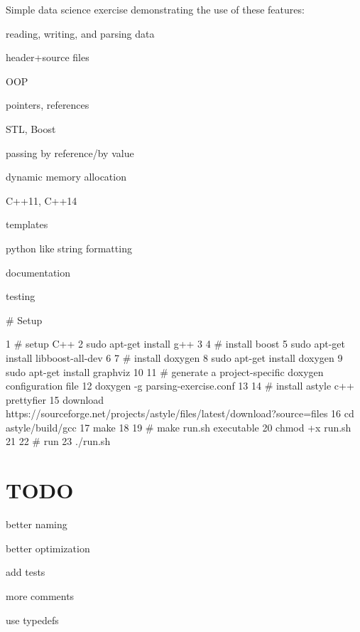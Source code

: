 Simple data science exercise demonstrating the use of these features\+:


\begin{DoxyItemize}
\item reading, writing, and parsing data
\item header+source files
\item O\+OP
\item pointers, references
\item S\+TL, Boost
\item passing by reference/by value
\item dynamic memory allocation
\item C++11, C++14
\item templates
\item python like string formatting
\item documentation
\item testing
\end{DoxyItemize}

\# Setup 
\begin{DoxyCode}
1 # setup C++
2 sudo apt-get install g++
3 
4 # install boost
5 sudo apt-get install libboost-all-dev
6 
7 # install doxygen
8 sudo apt-get install doxygen
9 sudo apt-get install graphviz
10 
11 # generate a project-specific doxygen configuration file
12 doxygen -g parsing-exercise.conf
13 
14 # install astyle c++ prettyfier
15 download https://sourceforge.net/projects/astyle/files/latest/download?source=files
16 cd astyle/build/gcc
17 make
18 
19 # make run.sh executable
20 chmod +x run.sh
21 
22 # run
23 ./run.sh
\end{DoxyCode}


\section*{T\+O\+DO}


\begin{DoxyItemize}
\item better naming
\item better optimization
\item add tests
\item more comments
\item use typedefs 
\end{DoxyItemize}